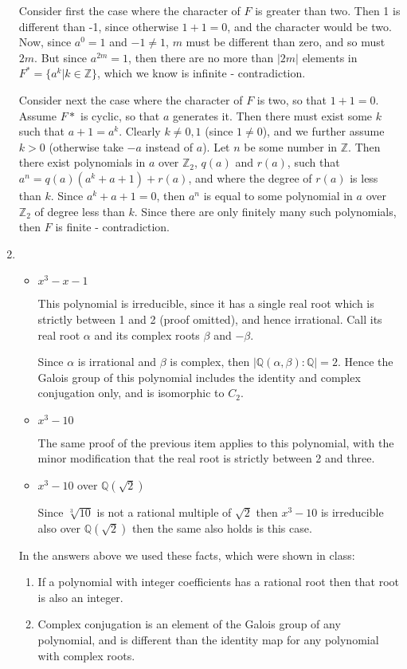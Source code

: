 \documentclass[11pt]{article} \usepackage{amssymb}
\newcommand{\Q}{\mathbb Q}
\newcommand{\Z}{\mathbb Z} \newcommand{\CalE}{{\mathcal{E}}}
\begin{document}
\begin{enumerate}
    Consider first the case where the character of $F$ is greater than two. Then
    1 is different than -1, since otherwise $1+1=0$, and the character would
    be two. Now, since $a^0=1$ and $-1\neq 1$, $m$ must be different than zero, 
    and so must $2m$.
    But since $a^{2m}=1$, then there are no more than $|2m|$ elements 
    in $F^*=\{a^k | k \in \Z\}$, which we know is infinite - contradiction.
    
    Consider next the case where the character of $F$ is two, so that $1+1=0$.
    Assume $F*$ is cyclic, so that $a$ generates it. Then there must exist
    some $k$ such that $a+1=a^k$. Clearly $k\neq 0,1$ (since $1\neq0$), 
    and we further assume $k>0$ (otherwise take $-a$ 
    instead of $a$). Let $n$ be some number in $\Z$. Then there exist polynomials
    in $a$ over $\Z_2$, 
    $q(a)$ and $r(a)$, such that $a^n=q(a)(a^k+a+1)+r(a)$, and where
    the degree of $r(a)$ is less than $k$. Since $a^k+a+1=0$, then $a^n$ is equal
    to some polynomial in $a$ over $\Z_2$ of degree less than $k$. Since
    there are only finitely many such polynomials, then $F$ is finite - 
    contradiction.

  \item
    \begin{itemize}
    \item $x^3-x-1$

      This polynomial is irreducible, since it has a single real root which
      is strictly between 1 and 2 (proof omitted), and hence irrational. 
      Call its real root
      $\alpha$ and its complex roots $\beta$ and $-\beta$. 

      Since $\alpha$ is irrational and $\beta$ is complex, then 
      $|\Q(\alpha,\beta):\Q|=2$. Hence the Galois group of this polynomial
      includes the identity and complex conjugation only, and is isomorphic
      to $C_2$.
      
    \item $x^3-10$
      
      The same proof of the previous item applies to this polynomial, with the
      minor modification that the real root is strictly between 2 and three.

    \item $x^3-10$ over $\Q(\sqrt{2})$

      Since $\sqrt[3]{10}$ is not a rational multiple of $\sqrt{2}$ then
      $x^3-10$ is irreducible also over $\Q(\sqrt{2})$ then the same
      also holds is this case.

    \end{itemize}
    In the answers above we used these facts, which were shown in class:
    \begin{enumerate}
    \item If a 
      polynomial with integer coefficients has a rational root then that root
      is also an integer.
    \item Complex conjugation is an element of the Galois group of any 
      polynomial, and is different than the identity map for any polynomial
      with complex roots.
    \end{enumerate}
    

\end{enumerate}
\end{document}
